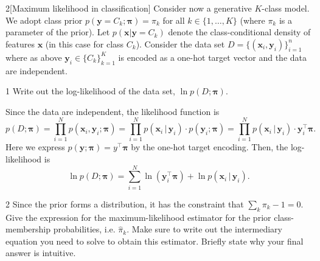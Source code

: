 \documentclass[expanded]{lkx_pset}
\begin{document}
\begin{problem}{2}[Maximum likelihood in classification]
Consider now a generative $K$-class model.  We adopt class prior
$p(\bm{y}= C_k; \bm{\pi}) = \pi_k$ for all $k \in \{1, \ldots, K\}$
(where $\pi_k$ is a parameter of the prior).
Let  $p(\bm{x}|\bm{y}=C_k)$ denote
the class-conditional density of features $\bm{x}$ (in this
case for class $C_k$). Consider the data set $D = \{(\bm{x}_i,
	\bm{y}_i)\}_{i=1}^n$ where as above $\bm{y}_i \in \{C_k\}_{k=1}^K$ is
encoded as a one-hot target vector and the data are independent.
\end{problem}

\begin{parts}
	\begin{part}{1}
		Write out the log-likelihood of the data set, $\ln p(D; \bm{\pi})$.
	\end{part}

	Since the data are independent, the likelihood function is
	\[
		p(D; \bm{\pi}) = \prod_{i=1}^N p(\bm{x}_i, \bm{y}_i; \bm{\pi}) = \prod_{i=1}^N p(\bm{x}_i\, |\, \bm{y}_i)\cdot {p(\bm{y}_i; \bm{\pi})} = \prod^N_{i=1} p(\bm{x}_i\,|\,\bm{y}_i)\cdot {\bm{y}_i^\intercal\bm{\pi}}.
	\]
	Here we express $p(\bm{y}; \bm{\pi})=y^\intercal\bm{\pi}$ by the one-hot target encoding. Then, the log-likelihood is
	\[
		\ln p(D; \bm{\pi}) = \sum^N_{i=1}\ln(\bm{y}_i^\intercal \bm{\pi}) +\ln p(\bm{x}_i\,|\,\bm{y}_i).
	\]

	\begin{part}{2}
		Since the prior forms a distribution, it has the constraint that
		$\sum_k\pi_k - 1 = 0$. Give the
		expression for the maximum-likelihood estimator for the prior
		class-membership probabilities, i.e.
		$\widehat \pi_k.$
		Make sure to write out the intermediary equation you need
		to solve to obtain this estimator. Briefly state why your final answer is intuitive.
	\end{part}


\end{parts}
\end{document}
